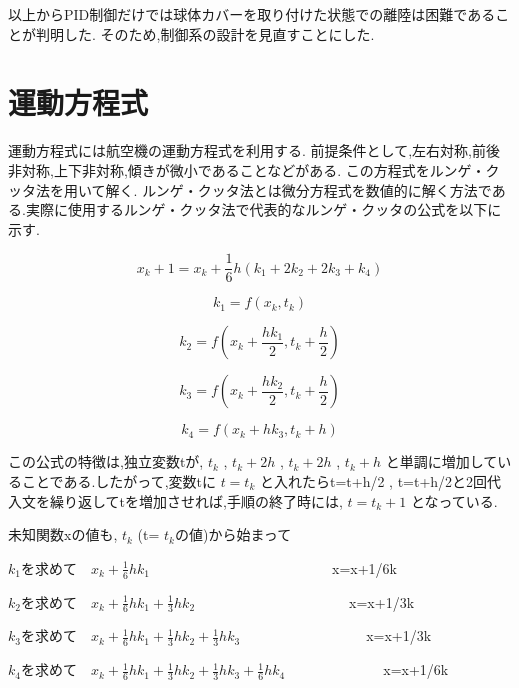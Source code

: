 \documentclass[12pt,oneside]{sotsuken_paper}
\begin{document}
以上からPID制御だけでは球体カバーを取り付けた状態での離陸は困難であることが判明した.
そのため,制御系の設計を見直すことにした.

\section{運動方程式}
運動方程式には航空機の運動方程式を利用する.
前提条件として,左右対称,前後非対称,上下非対称,傾きが微小であることなどがある.
この方程式をルンゲ・クッタ法を用いて解く.
ルンゲ・クッタ法とは微分方程式を数値的に解く方法である.実際に使用するルンゲ・クッタ法で代表的なルンゲ・クッタの公式を以下に示す.

\begin{equation}
	x_k+1 = x_k+\frac{1}{6}h(k_1+2k_2+2k_3+k_4)
	\label{eq1}
\end{equation}

\begin{equation}
	k_1 = f(x_k,t_k)
	\label{eq2}
\end{equation}

\begin{equation}
	k_2 = f(x_k+\frac{hk_1}{2},t_k+\frac{h}{2})
	\label{eq3}
\end{equation}

\begin{equation}
	k_3 = f(x_k+\frac{hk_2}{2},t_k+\frac{h}{2})
	\label{eq4}
\end{equation}

\begin{equation}
	k_4 = f(x_k+hk_3,t_k+h)
	\label{eq5}
\end{equation}

この公式の特徴は,独立変数tが, \(t_k\) , \(t_k+2h\) , \(t_k+2h\) , \(t_k+h\) と単調に増加していることである.したがって,変数tに \(t=t_k\) と入れたらt=t+h/2 , t=t+h/2と2回代入文を繰り返してtを増加させれば,手順の終了時には, \(t=t_k+1\) となっている.


未知関数xの値も, \(t_k\) (t= \(t_k\)の値)から始まって

\(k_1\)を求めて　\(x_k+\frac{1}{6}hk_1\)　　　　　　　　　　　　　x=x+1/6k


\(k_2\)を求めて　\(x_k+\frac{1}{6}hk_1+\frac{1}{3}hk_2\)　　　　　　　　　　　x=x+1/3k


\(k_3\)を求めて　\(x_k+\frac{1}{6}hk_1+\frac{1}{3}hk_2+\frac{1}{3}hk_3\)　　　　　　　　　x=x+1/3k


\(k_4\)を求めて　\(x_k+\frac{1}{6}hk_1+\frac{1}{3}hk_2+\frac{1}{3}hk_3+\frac{1}{6}hk_4\)　　　　　　　x=x+1/6k
\end{document}
